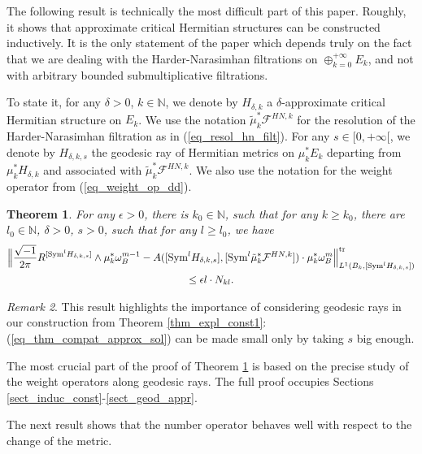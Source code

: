 \documentclass[12pt]{article}
\numberwithin{equation}{section}
\theoremstyle{theorem}
\newtheorem{thm}{Theorem}[section]
\theoremstyle{definition}
\theoremstyle{remark}
\newtheorem{rem}[thm]{Remark}
\newcommand{\imun} {\sqrt{-1}}
\newcommand{\nat}{\mathbb{N}}
\begin{document}
	\par 
	The following result is technically the most difficult part of this paper. 
	Roughly, it shows that approximate critical Hermitian structures can be constructed inductively.
	It is the only statement of the paper which depends truly on the fact that we are dealing with the Harder-Narasimhan filtrations on $\oplus_{k = 0}^{+ \infty} E_k$, and not with arbitrary bounded submultiplicative filtrations.
	\par 
	To state it, for any $\delta > 0$, $k \in \nat$, we denote by $H_{\delta, k}$ a $\delta$-approximate critical Hermitian structure on $E_k$.
	We use the notation $\tilde{\mu}_k^* \mathcal{F}^{HN, k}$ for the resolution of the Harder-Narasimhan filtration as in (\ref{eq_resol_hn_filt}).
	For any $s \in [0, + \infty[$, we denote by $H_{\delta, k, s}$ the geodesic ray of Hermitian metrics on $\mu_k^* E_k$ departing from $\mu_k^* H_{\delta, k}$ and associated with $\tilde{\mu}_k^* \mathcal{F}^{HN, k}$.
	We also use the notation for the weight operator from (\ref{eq_weight_op_dd}).
	\begin{thm}\label{thm_compat_approx_sol}
		For any $\epsilon > 0$, there is $k_0 \in \nat$, such that for any $k \geq k_0$, there are $l_0 \in \nat$, $\delta > 0$, $s > 0$, such that for any $l \geq l_0$, we have
		\begin{multline}\label{eq_thm_compat_approx_sol}
			\Big\|
				\frac{\imun}{2 \pi} R^{[{\rm{Sym}}^l H_{\delta, k, s}]}
				\wedge
				\mu_k^* \omega_B^{m - 1}
				-
				A([{\rm{Sym}}^l H_{\delta, k, s}], [{\rm{Sym}}^l \tilde{\mu}_k^* \mathcal{F}^{HN, k}])
				\cdot
				\mu_k^* \omega_B^m
			\Big\|_{L^1(B_k, [{\rm{Sym}}^l H_{\delta, k, s}])}^{{\rm{tr}}}
			\\
			\leq \epsilon l \cdot N_{kl}.
		\end{multline}
	\end{thm}
	\begin{rem}
		This result highlights the importance of considering geodesic rays in our construction from Theorem \ref{thm_expl_const1}: (\ref{eq_thm_compat_approx_sol}) can be made small only by taking $s$ big enough.	 
	\end{rem}
	\par 
	The most crucial part of the proof of Theorem \ref{thm_compat_approx_sol} is based on the precise study of the weight operators along geodesic rays.
	The full proof occupies Sections \ref{sect_induc_const}-\ref{sect_geod_appr}.
	\par 
	The next result shows that the number operator behaves well with respect to the change of the metric. 
\end{document}
